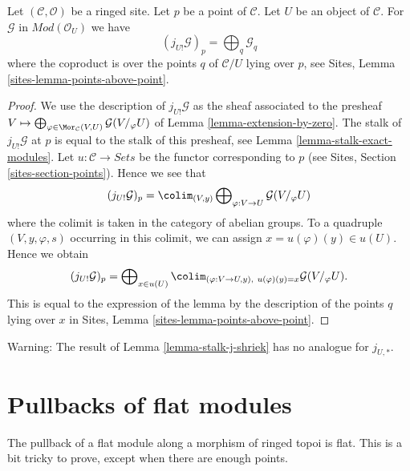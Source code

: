\begin{lemma}
\label{lemma-stalk-j-shriek}
Let $(\mathcal{C}, \mathcal{O})$ be a ringed site.
Let $p$ be a point of $\mathcal{C}$. Let $U$ be an object of $\mathcal{C}$.
For $\mathcal{G}$ in $\textit{Mod}(\mathcal{O}_U)$ we have
$$
(j_{U!}\mathcal{G})_p =
\bigoplus\nolimits_q \mathcal{G}_q
$$
where the coproduct is over the points $q$ of $\mathcal{C}/U$
lying over $p$, see
Sites, Lemma \ref{sites-lemma-points-above-point}.
\end{lemma}

\begin{proof}
We use the description of $j_{U!}\mathcal{G}$ as the sheaf associated
to the presheaf
$V \mapsto
\bigoplus\nolimits_{\varphi \in \Mor_\mathcal{C}(V, U)}
\mathcal{G}(V/_\varphi U)$
of
Lemma \ref{lemma-extension-by-zero}.
The stalk of $j_{U!}\mathcal{G}$ at $p$ is equal to the
stalk of this presheaf, see
Lemma \ref{lemma-stalk-exact-modules}.
Let $u : \mathcal{C} \to \textit{Sets}$ be the functor corresponding
to $p$ (see Sites, Section \ref{sites-section-points}).
Hence we see that
$$
(j_{U!}\mathcal{G})_p = \colim_{(V, y)}
\bigoplus\nolimits_{\varphi : V \to U} \mathcal{G}(V/_\varphi U)
$$
where the colimit is taken in the category of abelian groups.
To a quadruple $(V, y, \varphi, s)$ occurring in this colimit, we can assign
$x = u(\varphi)(y) \in u(U)$. Hence we obtain
$$
(j_{U!}\mathcal{G})_p =
\bigoplus\nolimits_{x \in u(U)}
\colim_{(\varphi : V \to U, y), \ u(\varphi)(y) = x} \mathcal{G}(V/_\varphi U).
$$
This is equal to the expression of the lemma by the description
of the points $q$ lying over $x$ in
Sites, Lemma \ref{sites-lemma-points-above-point}.
\end{proof}

\begin{remark}
\label{remark-not-pushforward}
Warning: The result of
Lemma \ref{lemma-stalk-j-shriek}
has no analogue for $j_{U, *}$.
\end{remark}












\section{Pullbacks of flat modules}
\label{section-pullback-flat}

\noindent
The pullback of a flat module along a morphism of ringed topoi is flat.
This is a bit tricky to prove, except when there are enough points.

